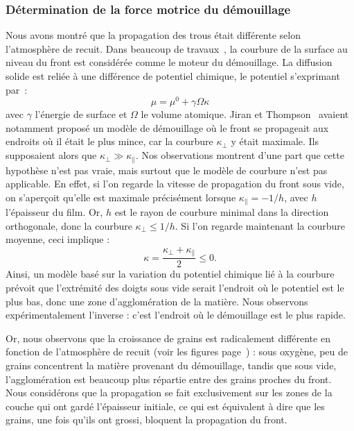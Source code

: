 			\subsubsection{Détermination de la force motrice du démouillage}
Nous avons montré que la propagation des trous était différente selon l'atmosphère de recuit. Dans beaucoup de travaux~\cite{presland1972hillock, jiran1990capillary, zucker2013model}, la courbure de la surface au niveau du front est considérée comme le moteur du démouillage. La diffusion solide est reliée à une différence de potentiel chimique, le potentiel s'exprimant par~:
\begin{equation}
\mu = \mu^0 +\gamma \Omega \kappa
\end{equation}
avec $\gamma$ l'énergie de surface et $\Omega$ le volume atomique. Jiran et Thompson~\cite{jiran1990capillary} avaient notamment proposé un modèle de démouillage où le front se propageait aux endroits où il était le plus mince, car la courbure $\kappa_\perp$ y était maximale. Ils supposaient alors que $\kappa_\perp \gg \kappa_\parallel$. Nos observations montrent d'une part que cette hypothèse n'est pas vraie, mais surtout que le modèle de courbure n'est pas applicable. En effet, si l'on regarde la vitesse de propagation du front sous vide, on s'aperçoit qu'elle est maximale précisément lorsque $\kappa_\parallel = -1/h$, avec $h$ l'épaisseur du film. Or, $h$ est le rayon de courbure minimal dans la direction orthogonale, donc la courbure $\kappa_\perp\leq 1/h$. Si l'on regarde maintenant la courbure moyenne, ceci implique :
\begin{equation}
\kappa = \dfrac{\kappa_\perp+\kappa_\parallel}{2}\leq 0.
\end{equation}
Ainsi, un modèle basé sur la variation du potentiel chimique lié à la courbure prévoit que l'extrémité des doigts sous vide serait l'endroit où le potentiel est le plus bas, donc une zone d'agglomération de la matière. Nous observons expérimentalement l'inverse : c'est l'endroit où le démouillage est le plus rapide.\par 
{}
Or, nous observons que la croissance de grains est radicalement différente en fonction de l'atmosphère de recuit (voir les figures page~\pageref{MEBgrainsOx}) : sous oxygène, peu de grains concentrent la matière provenant du démouillage, tandis que sous vide, l'agglomération est beaucoup plus répartie entre des grains proches du front. Nous considérons que la propagation se fait exclusivement sur les zones de la couche qui ont gardé l'épaisseur initiale, ce qui est équivalent à dire que les grains, une fois qu'ils ont grossi, bloquent la propagation du front.\par 
